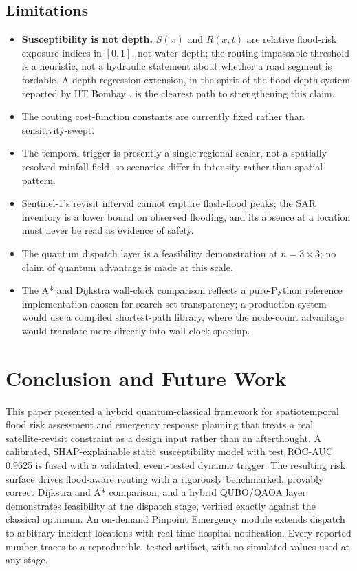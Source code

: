 \documentclass[conference]{IEEEtran}
\begin{document}
\subsection{Limitations}
\label{sec:limitations}
\begin{itemize}
\item \textbf{Susceptibility is not depth.} $S(x)$ and $R(x,t)$ are relative flood-risk exposure indices in $[0,1]$, not water depth; the routing impassable threshold is a heuristic, not a hydraulic statement about whether a road segment is fordable. A depth-regression extension, in the spirit of the flood-depth system reported by IIT Bombay \cite{sadhwani2026}, is the clearest path to strengthening this claim.
\item The routing cost-function constants are currently fixed rather than sensitivity-swept.
\item The temporal trigger is presently a single regional scalar, not a spatially resolved rainfall field, so scenarios differ in intensity rather than spatial pattern.
\item Sentinel-1's revisit interval cannot capture flash-flood peaks; the SAR inventory is a lower bound on observed flooding, and its absence at a location must never be read as evidence of safety.
\item The quantum dispatch layer is a feasibility demonstration at $n=3\times3$; no claim of quantum advantage is made at this scale.
\item The A* and Dijkstra wall-clock comparison reflects a pure-Python reference implementation chosen for search-set transparency; a production system would use a compiled shortest-path library, where the node-count advantage would translate more directly into wall-clock speedup.
\end{itemize}

\section{Conclusion and Future Work}
This paper presented a hybrid quantum-classical framework for spatiotemporal flood risk assessment and emergency response planning that treats a real satellite-revisit constraint as a design input rather than an afterthought. A calibrated, SHAP-explainable static susceptibility model with test ROC-AUC 0.9625 is fused with a validated, event-tested dynamic trigger. The resulting risk surface drives flood-aware routing with a rigorously benchmarked, provably correct Dijkstra and A* comparison, and a hybrid QUBO/QAOA layer demonstrates feasibility at the dispatch stage, verified exactly against the classical optimum. An on-demand Pinpoint Emergency module extends dispatch to arbitrary incident locations with real-time hospital notification. Every reported number traces to a reproducible, tested artifact, with no simulated values used at any stage.
\end{document}

